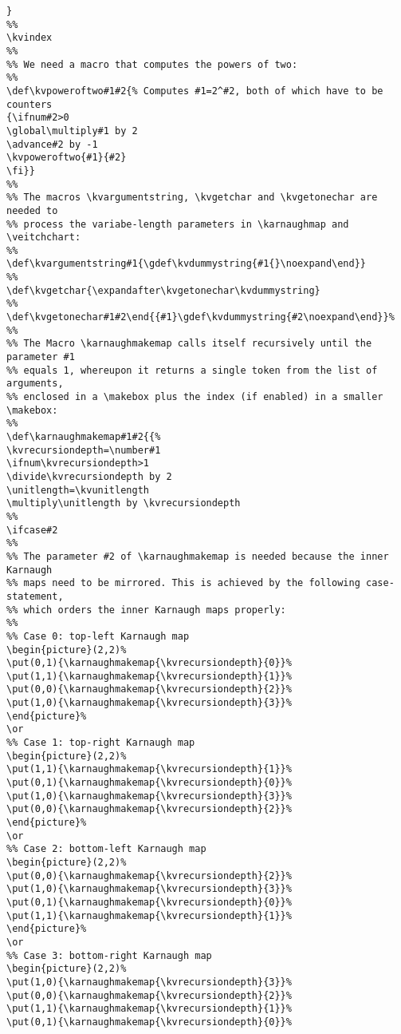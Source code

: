 \documentclass{article}
\begin{document}
\begin{verbatim}
}
%%
\kvindex
%%
%% We need a macro that computes the powers of two:
%%
\def\kvpoweroftwo#1#2{% Computes #1=2^#2, both of which have to be counters
{\ifnum#2>0 
\global\multiply#1 by 2 
\advance#2 by -1
\kvpoweroftwo{#1}{#2}
\fi}}
%%
%% The macros \kvargumentstring, \kvgetchar and \kvgetonechar are needed to
%% process the variabe-length parameters in \karnaughmap and \veitchchart:
%%
\def\kvargumentstring#1{\gdef\kvdummystring{#1{}\noexpand\end}}
%%
\def\kvgetchar{\expandafter\kvgetonechar\kvdummystring}
%%
\def\kvgetonechar#1#2\end{{#1}\gdef\kvdummystring{#2\noexpand\end}}%
%%
%% The Macro \karnaughmakemap calls itself recursively until the parameter #1
%% equals 1, whereupon it returns a single token from the list of arguments,
%% enclosed in a \makebox plus the index (if enabled) in a smaller \makebox:
%%
\def\karnaughmakemap#1#2{{%
\kvrecursiondepth=\number#1
\ifnum\kvrecursiondepth>1
\divide\kvrecursiondepth by 2
\unitlength=\kvunitlength
\multiply\unitlength by \kvrecursiondepth
%%
\ifcase#2
%%
%% The parameter #2 of \karnaughmakemap is needed because the inner Karnaugh
%% maps need to be mirrored. This is achieved by the following case-statement,
%% which orders the inner Karnaugh maps properly:
%%
%% Case 0: top-left Karnaugh map
\begin{picture}(2,2)%
\put(0,1){\karnaughmakemap{\kvrecursiondepth}{0}}%
\put(1,1){\karnaughmakemap{\kvrecursiondepth}{1}}%
\put(0,0){\karnaughmakemap{\kvrecursiondepth}{2}}%
\put(1,0){\karnaughmakemap{\kvrecursiondepth}{3}}%
\end{picture}%
\or
%% Case 1: top-right Karnaugh map
\begin{picture}(2,2)%
\put(1,1){\karnaughmakemap{\kvrecursiondepth}{1}}%
\put(0,1){\karnaughmakemap{\kvrecursiondepth}{0}}%
\put(1,0){\karnaughmakemap{\kvrecursiondepth}{3}}%
\put(0,0){\karnaughmakemap{\kvrecursiondepth}{2}}%
\end{picture}%
\or
%% Case 2: bottom-left Karnaugh map
\begin{picture}(2,2)%
\put(0,0){\karnaughmakemap{\kvrecursiondepth}{2}}%
\put(1,0){\karnaughmakemap{\kvrecursiondepth}{3}}%
\put(0,1){\karnaughmakemap{\kvrecursiondepth}{0}}%
\put(1,1){\karnaughmakemap{\kvrecursiondepth}{1}}%
\end{picture}%
\or
%% Case 3: bottom-right Karnaugh map
\begin{picture}(2,2)%
\put(1,0){\karnaughmakemap{\kvrecursiondepth}{3}}%
\put(0,0){\karnaughmakemap{\kvrecursiondepth}{2}}%
\put(1,1){\karnaughmakemap{\kvrecursiondepth}{1}}%
\put(0,1){\karnaughmakemap{\kvrecursiondepth}{0}}%

\end{verbatim}
\end{document}
